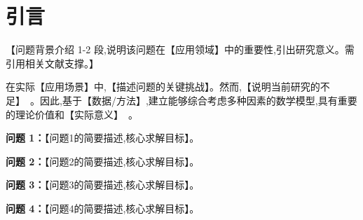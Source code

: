 
\section{引言}

【问题背景介绍 1-2 段,说明该问题在【应用领域】中的重要性,引出研究意义。需引用相关文献支撑。】

在实际【应用场景】中,【描述问题的关键挑战】。然而,【说明当前研究的不足】~\cite{ref1}。因此,基于【数据/方法】,建立能够综合考虑多种因素的数学模型,具有重要的理论价值和【实际意义】~\cite{ref2}。

\textbf{问题 1：}【问题1的简要描述,核心求解目标】。

\textbf{问题 2：}【问题2的简要描述,核心求解目标】。

\textbf{问题 3：}【问题3的简要描述,核心求解目标】。

\textbf{问题 4：}【问题4的简要描述,核心求解目标】。
